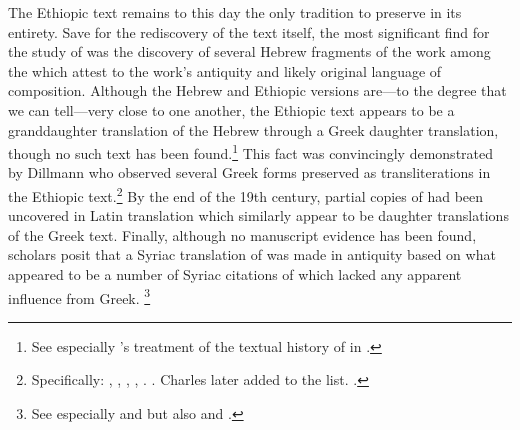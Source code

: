 The Ethiopic text remains to this day the only tradition to preserve \jub in its entirety. Save for the rediscovery of the text itself, the most significant find for the study of \jub was the discovery of several Hebrew fragments of the work among the \dss which attest to the work's antiquity and likely original language of composition. Although the Hebrew and Ethiopic versions are---to the degree that we can tell---very close to one another, the Ethiopic text appears to be a granddaughter translation of the Hebrew through a Greek daughter translation, though no such text has been found.\footnote{See especially \vanderkam's treatment of the textual history of \jub in \cite*[1--18]{vanderkam1977}.} This fact was convincingly demonstrated by Dillmann who observed several Greek forms preserved as transliterations in the Ethiopic text.\footnote{Specifically: , , , , . \cite[88]{dillamnn_jbw1850}. Charles later added  to the list. \cite[xxx]{charles1902}.} By the end of the 19th century, partial copies of \jub had been uncovered in Latin translation which similarly appear to be daughter translations of the Greek text. Finally, although no manuscript evidence has been found, \jub scholars posit that a Syriac translation of \jub was made in antiquity based on what appeared to be a number of Syriac citations of \jub which lacked any apparent influence from Greek.%
%
\footnote{%
See especially \cite[231--232]{tisserant_rb1921} and \cite[xxix]{charles1902} but also \cite[2:ix--x]{ceriani1863} and \cite[x]{charles1895}.}


\nocite{dillamnn_jbw_kleine}